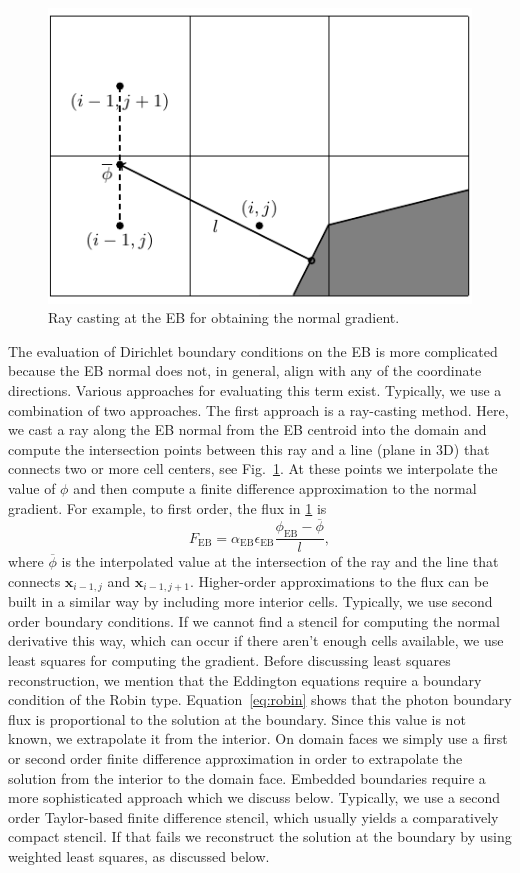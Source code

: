 \documentclass[3p]{elsarticle}
\begin{document}
\begin{figure}[ht]
  \centering
  \includegraphics{./figures/raycast}
  \caption{Ray casting at the EB for obtaining the normal gradient. }
  \label{fig:raycast}
\end{figure}

The evaluation of Dirichlet boundary conditions on the EB is more complicated because the EB normal does not, in general, align with any of the coordinate directions. Various approaches for evaluating this term exist. Typically, we use a combination of two approaches. The first approach is a ray-casting method. Here, we cast a ray along the EB normal from the EB centroid into the domain and compute the intersection points between this ray and a line (plane in 3D) that connects two or more cell centers, see Fig.~\ref{fig:raycast}. At these points we interpolate the value of $\phi$ and then compute a finite difference approximation to the normal gradient. For example, to first order, the flux in \ref{fig:raycast} is
\begin{equation}
  F_{\text{EB}} = \alpha_{\text{EB}}\epsilon_{\text{EB}}\frac{\phi_{\text{EB}} - \overline{\phi}}{l},
\end{equation}
where $\overline{\phi}$ is the interpolated value at the intersection of the ray and the line that connects $\bm{x}_{i-1, j}$ and $\bm{x}_{i-1, j+1}$. 
Higher-order approximations to the flux can be built in a similar way by including more interior cells. Typically, we use second order boundary conditions. If we cannot find a stencil for computing the normal derivative this way, which can occur if there aren't enough cells available, we use least squares for computing the gradient. Before discussing least squares reconstruction, we mention that the Eddington equations require a boundary condition of the Robin type. Equation~\eqref{eq:robin} shows that the photon boundary flux is proportional to the solution at the boundary. Since this value is not known, we extrapolate it from the interior. On domain faces we simply use a first or second order finite difference approximation in order to extrapolate the solution from the interior to the domain face. Embedded boundaries require a more sophisticated approach which we discuss below. Typically, we use a second order Taylor-based finite difference stencil, which usually yields a comparatively compact stencil. If that fails we reconstruct the solution at the boundary by using weighted least squares, as discussed below. 
\end{document}
